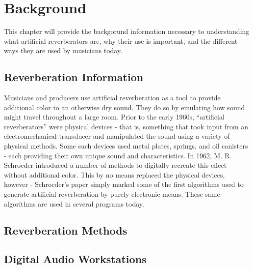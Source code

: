 \chapter{Background}
\hspace*{-0.155cm}This chapter will provide the backgorund information necessary to understanding what artificial reverberators are, why their use is important, and the different ways they are used by musicians today.

\section{Reverberation Information}
Musicians and producers use artificial reverberation as a tool to provide additional color to an otherwise dry sound. They do so by emulating how sound might travel throughout a large room. Prior to the early 1960s, ``artificial reverberators'' were physical devices - that is, something that took input from an electromechanical transducer and manipulated the sound using a variety of physical methods. Some such devices used metal plates, springs, and oil canisters - each providing their own unique sound and characteristics. In 1962, M. R. Schroeder introduced a number of methods to digitally recreate this effect without additional color. This by no means replaced the physical devices, however - Schroeder's paper simply marked some of the first algorithms used to generate artificial reverberation by purely electronic means. These same algorithms are used in several programs today.

\section{Reverberation Methods}

\section{Digital Audio Workstations}
